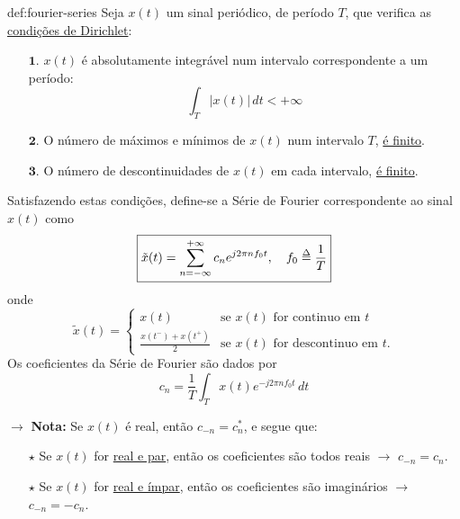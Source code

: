 \begin{theo}{def:fourier-series}\label{def:fourier-series}
    Seja $x(t)$ um sinal periódico, de período $T$, que verifica as \underline{condições de Dirichlet}:
    
    \vspace{-0.75em}
    \begin{enumerate}[leftmargin=2em]
        \item[$\pmb{1.}$] $x(t)$ é absolutamente integrável num intervalo correspondente a um período:
        $$
            \int_T \left|x(t)\right|\, dt < +\infty
        $$
        \item[$\pmb{2.}$] O número de máximos e mínimos de $x(t)$ num intervalo $T$, \underline{é finito}.
        
        \item[$\pmb{3.}$] O número de descontinuidades de $x(t)$ em cada intervalo, \underline{é finito}.
    \end{enumerate}

    \noindent Satisfazendo estas condições, define-se a Série de Fourier correspondente ao sinal $x(t)$ como
    $$
        \boxed{\tilde{x}(t) = \sum_{n=-\infty}^{+\infty} c_n e^{j2\pi n f_0 t},\quad f_0 \delequal \frac{1}{T}}
    $$
    onde
    $$
    \tilde{x}(t) =
    \begin{cases}
        x(t) & \text{se $x(t)$ for continuo em $t$} \\
        \frac{x(t^-) + x(t^+)}{2} & \text{se $x(t)$ for descontinuo em $t$.}
    \end{cases}
    $$
    Os coeficientes da Série de Fourier são dados por
    $$
        c_n = \frac{1}{T} \int_T x(t) e^{-j 2\pi n f_0 t}\, dt
    $$

    \vspace{0.5em}
    \noindent $\pmb{\rightarrow}$ \textbf{Nota:} Se $x(t)$ é real, então \underline{$c_{-n} = c_{n}^*$}, e segue que: 
    
    \vspace{-0.75em}
    \begin{enumerate}[leftmargin=2em]
        \item[$\pmb{\star}$] Se $x(t)$ for \underline{real e par}, então os coeficientes são todos reais $\rightarrow$ $c_{-n} = c_{n}$. 
        
        \item[$\pmb{\star}$] Se $x(t)$ for \underline{real e ímpar}, então os coeficientes são imaginários $\rightarrow$ $c_{-n} = -c_{n}$.
    \end{enumerate}
\end{theo}

